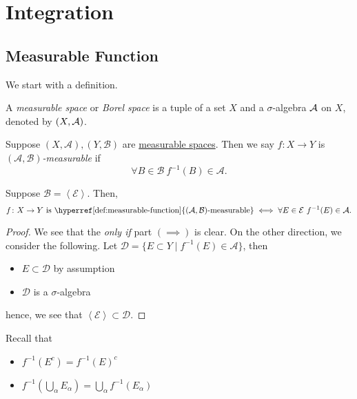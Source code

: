 \section{Integration}
\subsection{Measurable Function}
We start with a definition.

\begin{definition}\label{def:measurable-space}
	A \emph{measurable space} or \emph{Borel space} is a tuple of a set \(X\) and a \(\sigma\)-algebra \(\mathcal{\MakeUppercase{a}} \) on \(X\),
	denoted by \((X, \mathcal{\MakeUppercase{a}} )\).
\end{definition}

\begin{definition}\label{def:measurable-function}
	Suppose \((X, \mathcal{A} ), (Y, \mathcal{B} )\) are \hyperref[def:measurable-space]{measurable spaces}. Then we say \(f\colon X\to Y\) is
	\emph{\((\mathcal{A} , \mathcal{B} )\)-measurable} if
	\[
		\forall B\in \mathcal{B}\ f^{-1} (B)\in \mathcal{A}.
	\]
\end{definition}

\begin{lemma}\label{lma:lec10-1}
	Suppose \(\mathcal{B} = \left< \mathcal{E}  \right> \). Then,
	\[
		f\colon X\to Y \text{ is \hyperref[def:measurable-function]{\((\mathcal{A} , \mathcal{B})\)-measurable}}\iff \forall E\in\mathcal{E} \ f^{-1} (E)\in \mathcal{A}.
	\]
\end{lemma}
\begin{proof}
	We see that the \emph{only if} part \((\implies )\) is clear. On the other direction, we consider the following. Let
	\(\mathcal{D} = \{E\subset Y \mid f^{-1} (E)\in \mathcal{A} \}\), then
	\begin{itemize}
		\item \(E\subset \mathcal{D} \) by assumption
		\item \(\mathcal{D} \) is a \(\sigma\)-algebra 
	\end{itemize}
	hence, we see that \(\left< \mathcal{E} \right> \subset \mathcal{D} \).
\end{proof}
\begin{note}
	Recall that
	\begin{itemize}
		\item \(f^{-1} (E^{c} ) = f^{-1} (E)^{c} \)
		\item \(f^{-1} \left(\bigcup\limits_{\alpha} E_{\alpha }\right) = \bigcup\limits_{\alpha} f^{-1} (E_{\alpha })\)
	\end{itemize}
\end{note}

